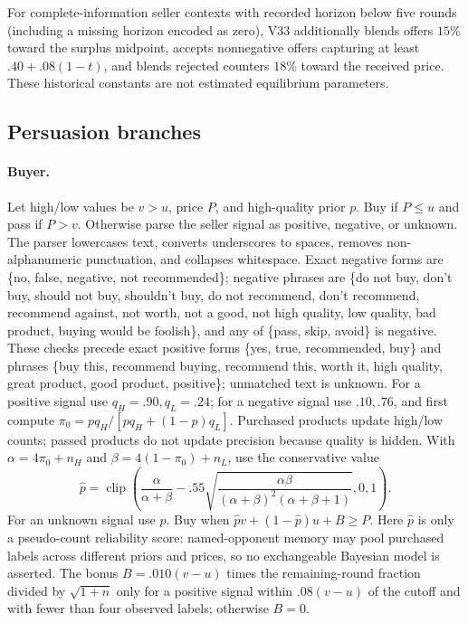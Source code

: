 For complete-information seller contexts with recorded horizon below five
rounds (including a missing horizon encoded as zero), V33 additionally blends
offers $15\%$ toward the surplus midpoint, accepts nonnegative offers capturing
at least $.40+.08(1-t)$, and blends rejected counters $18\%$ toward the received
price. These historical constants are not estimated equilibrium parameters.

\subsection{Persuasion branches}

\paragraph{Buyer.}
Let high/low values be $v>u$, price $P$, and high-quality prior $p$. Buy if
$P\le u$ and pass if $P>v$. Otherwise parse the seller signal as positive,
negative, or unknown. The parser lowercases text, converts underscores to
spaces, removes non-alphanumeric punctuation, and collapses whitespace. Exact
negative forms are \{no, false, negative, not recommended\}; negative phrases
are \{do not buy, don't buy, should not buy, shouldn't buy, do not recommend,
don't recommend, recommend against, not worth, not a good, not high quality,
low quality, bad product, buying would be foolish\}, and any of \{pass, skip,
avoid\} is negative. These checks precede exact positive forms \{yes, true,
recommended, buy\} and phrases \{buy this, recommend buying, recommend this,
worth it, high quality, great product, good product, positive\}; unmatched text
is unknown.
For a positive signal use $q_H=.90,q_L=.24$; for a
negative signal use $.10,.76$, and first compute
$\pi_0=pq_H/[pq_H+(1-p)q_L]$. Purchased products update high/low counts; passed
products do not update precision because quality is hidden. With
$\alpha=4\pi_0+n_H$ and $\beta=4(1-\pi_0)+n_L$, use the conservative value
\[
 \hat p=\operatorname{clip}\left(
 \frac{\alpha}{\alpha+\beta}-.55
 \sqrt{\frac{\alpha\beta}{(\alpha+\beta)^2(\alpha+\beta+1)}},0,1\right).
\]
For an unknown signal use $p$. Buy when
$\hat p v+(1-\hat p)u+B\ge P$. Here $\hat p$ is only a pseudo-count reliability
score: named-opponent memory may pool purchased labels across different priors
and prices, so no exchangeable Bayesian model is asserted. The bonus
$B=.010(v-u)$ times the remaining-round
fraction divided by $\sqrt{1+n}$ only for a positive signal within $.08(v-u)$
of the cutoff and with fewer than four observed labels; otherwise $B=0$.


